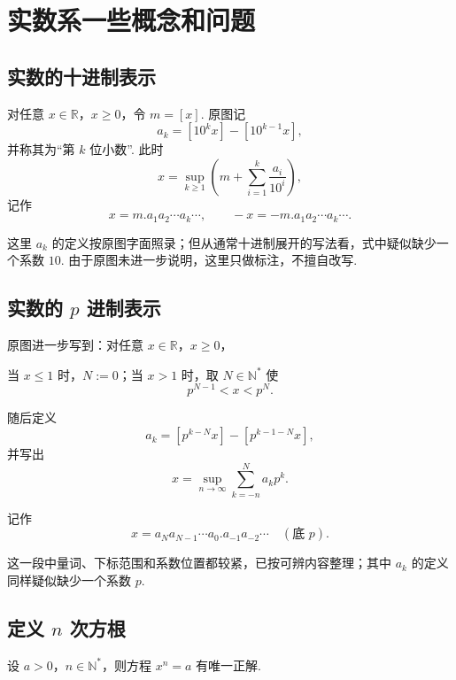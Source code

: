 \section{实数系一些概念和问题}

\subsection*{实数的十进制表示}

对任意 $x \in \mathbb{R}$，$x \ge 0$，令 $m=[x]$. 原图记
\[
a_k=[10^k x]-[10^{k-1}x],
\]
并称其为“第 $k$ 位小数”. 此时
\[
x=\sup_{k \ge 1}\left(m+\sum_{i=1}^k \frac{a_i}{10^i}\right),
\]
记作
\[
x=m.a_1a_2\cdots a_k\cdots,
\qquad
-x=-m.a_1a_2\cdots a_k\cdots.
\]

\begin{notebox}
这里 $a_k$ 的定义按原图字面照录；但从通常十进制展开的写法看，式中疑似缺少一个系数 $10$. 由于原图未进一步说明，这里只做标注，不擅自改写. 
\end{notebox}

\subsection*{实数的 $p$ 进制表示}

原图进一步写到：对任意 $x \in \mathbb{R}$，$x \ge 0$，

当 $x \le 1$ 时，$N:=0$；当 $x>1$ 时，取 $N \in \mathbb{N}^*$ 使
\[
p^{N-1}<x<p^N.
\]

随后定义
\[
a_k=[p^{k-N}x]-[p^{k-1-N}x],
\]
并写出
\[
x=\sup_{n \to \infty}\sum_{k=-n}^{N} a_k p^k.
\]

记作
\[
x=a_Na_{N-1}\cdots a_0.a_{-1}a_{-2}\cdots \quad (\text{底 } p).
\]

\begin{notebox}
这一段中量词、下标范围和系数位置都较紧，已按可辨内容整理；其中 $a_k$ 的定义同样疑似缺少一个系数 $p$. 
\end{notebox}

\subsection*{定义 $n$ 次方根}

\begin{theorem}[n次方根的存在唯一性]
设 $a > 0$，$n \in \mathbb{N}^*$，则方程 $x^n = a$ 有唯一正解. 
\end{theorem}

